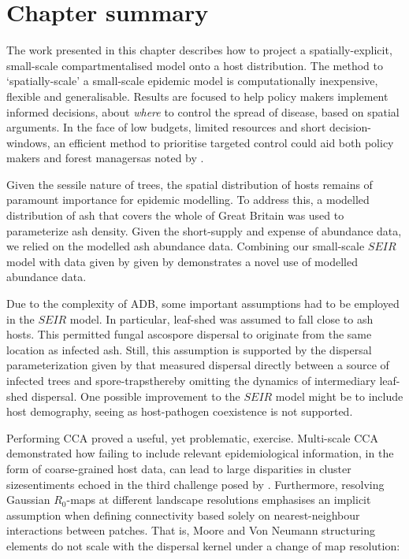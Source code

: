 \section{Chapter summary}

The work presented in this chapter describes how to project a spatially-explicit, small-scale compartmentalised model onto a host distribution.
The method to `spatially-scale' a small-scale epidemic model is computationally inexpensive, flexible and generalisable.
Results are focused to help policy makers implement informed decisions, about \textit{where} to control the spread of disease, based on spatial arguments.
In the face of low budgets, limited resources and short decision-windows, an efficient method to prioritise targeted control could aid both policy makers and forest managers\textemdash as noted by \cite{13-challenges, time-varying-infectivity}.

Given the sessile nature of trees, the spatial distribution of hosts remains of paramount importance for epidemic modelling.
To address this, a modelled distribution of ash that covers the whole of Great Britain was used to parameterize ash density.
Given the short-supply and expense of abundance data, we relied on the modelled ash abundance data.
Combining our small-scale $SEIR$ model with data given by given by \cite{hill.data} demonstrates a novel use of modelled abundance data.

Due to the complexity of ADB, some important assumptions had to be employed in the $SEIR$ model.
In particular, leaf-shed was assumed to fall close to ash hosts.
This permitted fungal ascospore dispersal to originate from the same location as infected ash.
Still, this assumption is supported by the dispersal parameterization given by \cite{grosdidier2018tracking} that 
measured dispersal directly between a source of infected trees and spore-traps\textemdash thereby omitting the dynamics of intermediary leaf-shed dispersal.
One possible improvement to the $SEIR$ model might be to include host demography, seeing as host-pathogen coexistence is not supported.

Performing CCA proved a useful, yet problematic, exercise.
Multi-scale CCA demonstrated how failing to include relevant epidemiological information, in the form of coarse-grained host data, can lead to large disparities in cluster size\textemdash sentiments echoed in the third challenge posed by \cite{13-challenges}.
Furthermore, resolving Gaussian $R_0$-maps at different landscape resolutions emphasises an implicit assumption when defining connectivity based solely on nearest-neighbour interactions between patches. 
That is, Moore and Von Neumann structuring elements do not scale with the dispersal kernel under a change of map resolution:

